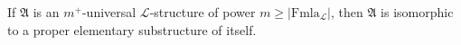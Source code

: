 If $\mathfrak{A}$ is an $m^+$-universal $\mathcal{L}$-structure of power $m \geq |\text{Fmla}_{\mathcal{L}}|$, then $\mathfrak{A}$ is isomorphic to a proper elementary substructure of itself.
